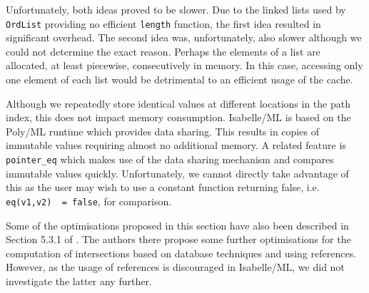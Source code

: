 Unfortunately, both ideas proved to be slower. Due to the linked lists used by \lstinline{OrdList} providing no efficient \lstinline{length} function, the first idea resulted in significant overhead. The second idea was, unfortunately, also slower although we could not determine the exact reason. Perhaps the elements of a list are allocated, at least piecewise, consecutively in memory. In this case, accessing only one element of each list would be detrimental to an efficient usage of the cache.

Although we repeatedly store identical values at different locations in the path index, this does not impact memory consumption. Isabelle/ML is based on the Poly/ML runtime \cite{noauthor_polyml_nodate} which provides data sharing. This results in copies of immutable values requiring almost no additional memory. A related feature is \lstinline{pointer_eq} \cite{noauthor_polyml_nodate-1} which makes use of the data sharing mechanism and compares immutable values quickly. Unfortunately, we cannot directly take advantage of this as the user may wish to use a constant function returning false, i.e. \lstinline{eq(v1,v2)  = false}, for comparison.

Some of the optimisations proposed in this section have also been described in Section 5.3.1 of \cite{twain_set-based_1995}.
The authors there propose some further optimisations for the computation of intersections based on database techniques and using references.
However, as the usage of references is discouraged in Isabelle/ML, we did not investigate the latter any further.
